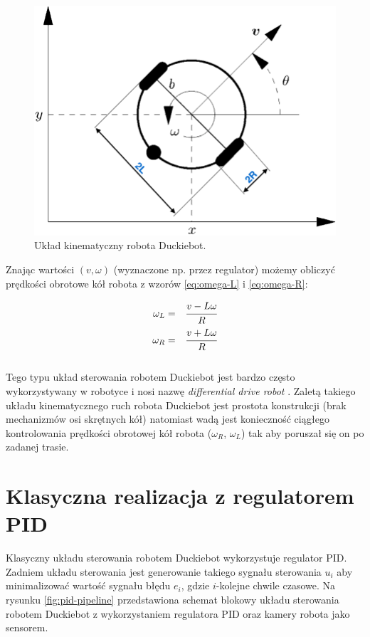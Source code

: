 \documentclass[conference]{IEEEtran}
\begin{document}
\begin{figure}[h]
    \centering
    \includegraphics[width=.8\columnwidth]{dt-kinematic}
    \caption{Układ kinematyczny robota Duckiebot.}
    \label{fig:duckiebot-kinematics}
\end{figure}

Znając wartości $(v, \omega)$ (wyznaczone np. przez regulator) możemy obliczyć prędkości obrotowe kół robota z wzorów \eqref{eq:omega-L} i \eqref{eq:omega-R}:

\begin{eqnarray}
	\omega_L & = & \cfrac{v-L\omega}{R} \label{eq:omega-L} \\
	\omega_R & = & \cfrac{v+L\omega}{R} \label{eq:omega-R}
\end{eqnarray}
\\
Tego typu układ sterowania robotem Duckiebot jest bardzo często wykorzystywany w robotyce i nosi nazwę \emph{differential drive robot} \cite{siegwart2011introduction}. Zaletą takiego układu kinematycznego ruch robota Duckiebot jest prostota konstrukcji (brak mechanizmów osi skrętnych kół) natomiast wadą jest konieczność ciągłego kontrolowania prędkości obrotowej kół robota ($\omega_R$, $\omega_L$) tak aby poruszał się on po zadanej trasie.


\section{Klasyczna realizacja z regulatorem PID}\label{sec:pid-controller}
Klasyczny układu sterowania robotem Duckiebot wykorzystuje regulator PID. Zadniem układu sterowania jest generowanie takiego sygnału sterowania $u_i$ aby minimalizować wartość sygnału błędu $e_i$, gdzie $i$-kolejne chwile czasowe. Na rysunku \ref{fig:pid-pipeline} przedstawiona schemat blokowy układu sterowania robotem Duckiebot z wykorzystaniem regulatora PID oraz kamery robota jako sensorem.
\end{document}
